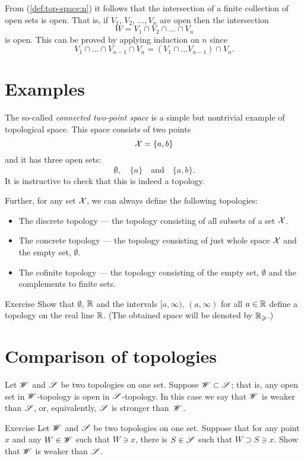 From (\ref{def:top-space:n}) it follows that the intersection of a finite collection of open sets is open.
That is, if $V_1$, $V_2$, $\dots, V_n$ are open then the intersection 
\[W=V_1 \cap V_2\cap\dots\cap V_n\] is open.
This can be proved by applying induction on $n$ since 
\[V_1 \cap \dots\cap V_{n-1}\cap V_n=(V_1 \cap \dots V_{n-1})\cap V_n.\]

\section{Examples}

The so-called \emph{connected two-point space} is a simple but nontrivial example of topological space.
This space consists of two points 
\[\mathcal{X}=\{a,b\}\]
and it has three open sets: 
\[\emptyset,\quad \{a\}\quad\text{and}\quad\{a,b\}.\]
It is instructive to check that this is indeed a topology.

Further, for any set $\mathcal{X}$, we can always define the following topologies:
\begin{itemize} 
\item  The discrete topology --- the topology consisting of all subsets of a set $\mathcal{X}$.
\item  The concrete topology  --- the topology consisting of just whole space $\mathcal{X}$ and the empty set, $\emptyset$.
\item  The cofinite topology --- the topology consisting of the empty set, $\emptyset$ and the complements to finite sets.
\end{itemize}

\begin{thm}{Exercise}\label{ex:Rge}
Show that $\emptyset$, $\mathbb{R}$ and the intervals $[a,\infty)$, $(a,\infty)$ for all $a\in\mathbb{R}$ define a topology on the real line $\mathbb{R}$.
(The obtained space will be denoted by $\mathbb{R}_\geqslant$.)
\end{thm}

\section{Comparison of topologies}

Let $\mathscr{W}$ and $\mathscr{S}$ be two topologies on one set.
Suppose $\mathscr{W}\subset\mathscr{S}$; that is, any open set in $\mathscr{W}$-topology is open in $\mathscr{S}$-topology.
In this case we say that $\mathscr{W}$ is weaker than $\mathscr{S}$, or, equivalently, $\mathscr{S}$ is stronger than~$\mathscr{W}$.

\begin{thm}{Exercise}
Let $\mathscr{W}$ and $\mathscr{S}$ be two topologies on one set.
Suppose that for any point $x$ and any $W\in\mathscr{W}$ such that $W\ni x$, there is $S\in \mathscr{S}$ such that 
$W\supset S\ni x$.
Show that $\mathscr{W}$ is weaker than $\mathscr{S}$.
\end{thm}



